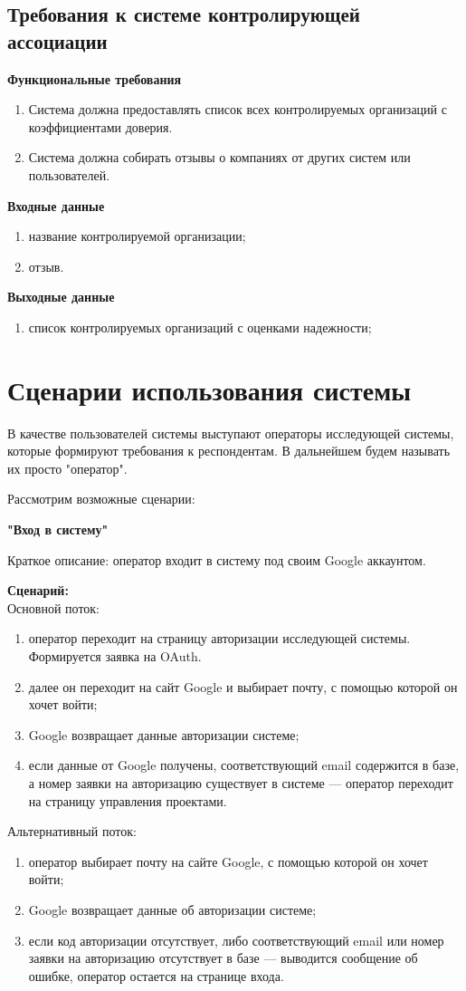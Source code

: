 \subsection{Требования к системе контролирующей ассоциации}

\textbf{Функциональные требования}
\begin{enumerate}
\item Система должна предоставлять список всех контролируемых организаций с коэффициентами доверия.
\item Система должна собирать отзывы о компаниях от других систем или пользователей.
\end{enumerate}

\textbf{Входные данные}
\begin{enumerate}
\item название контролируемой организации;
\item отзыв.
\end{enumerate}

\textbf{Выходные данные}
\begin{enumerate}
\item список контролируемых организаций с оценками надежности;
\end{enumerate}

\section{Сценарии использования системы}
В качестве пользователей системы выступают операторы исследующей системы, которые формируют требования к респондентам. В дальнейшем будем называть их просто "оператор". 

Рассмотрим возможные сценарии:

\textbf{"Вход в систему"}

Краткое описание: оператор входит в систему под своим Google аккаунтом.

\textbf{Сценарий:}\\
Основной поток:
\begin{enumerate}
\item оператор переходит на страницу авторизации исследующей системы. Формируется заявка на OAuth.
\item далее он переходит на сайт Google и выбирает почту, с помощью которой он хочет войти;
\item Google  возвращает данные авторизации системе;
\item если данные от Google получены, соответствующий email содержится в базе, а номер заявки на авторизацию существует в системе — оператор переходит на страницу управления проектами.
\end{enumerate}
Альтернативный поток:
\begin{enumerate}
\item оператор выбирает почту на сайте Google, с помощью которой он хочет войти;
\item Google возвращает данные об авторизации системе;
\item если код авторизации отсутствует, либо соответствующий email или номер заявки на авторизацию отсутствует в базе — выводится сообщение об ошибке, оператор остается на странице входа.
\end{enumerate}

